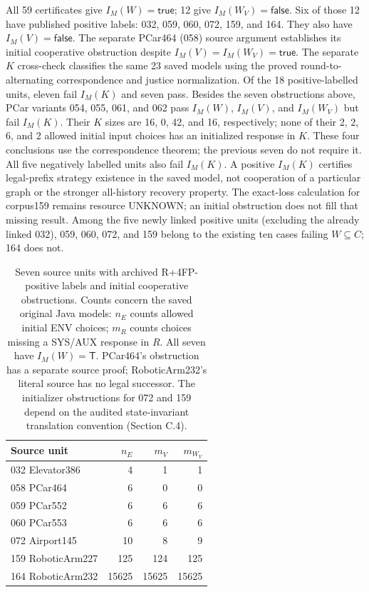\documentclass[11pt]{article}
\begin{document}
All 59 certificates give $I_M(W)=\mathsf{true}$; 12 give
$I_M(W_V)=\mathsf{false}$. Six of those 12 have published positive labels:
032, 059, 060, 072, 159, and 164. They also have $I_M(V)=\mathsf{false}$.
The separate PCar464 (058) source argument establishes its initial
cooperative obstruction despite $I_M(V)=I_M(W_V)=\mathsf{true}$.
The separate $K$ cross-check classifies the same 23 saved models using
the proved round-to-alternating correspondence and justice normalization.
Of the 18 positive-labelled units, eleven fail $I_M(K)$ and seven pass.
Besides the seven obstructions above, PCar variants 054, 055, 061, and 062
pass $I_M(W)$, $I_M(V)$, and $I_M(W_V)$ but fail $I_M(K)$.
Their $K$ sizes are 16, 0, 42, and 16, respectively; none of their
2, 2, 6, and 2 allowed initial input choices has an initialized response
in $K$. These four conclusions use the correspondence theorem; the
previous seven do not require it. All five negatively labelled units
also fail $I_M(K)$. A positive $I_M(K)$ certifies legal-prefix strategy
existence in the saved model, not cooperation of a particular graph
or the stronger all-history recovery property. The exact-loss calculation for corpus159 remains
resource UNKNOWN; an initial obstruction does not fill that missing result.
Among the five newly linked positive units (excluding the already linked 032),
059, 060, 072, and 159 belong to the existing ten cases failing
$W\subseteq C$; 164 does not.

\begin{table}[t]
\centering
\caption{Seven source units with archived R+4FP-positive labels and
initial cooperative obstructions. Counts concern the saved original Java models: $n_E$ counts allowed
initial ENV choices; $m_R$ counts choices missing a SYS/AUX response in $R$.
All seven have $I_M(W)=\mathsf{T}$. PCar464's obstruction has a separate
source proof; RoboticArm232's literal source has no legal successor.
The initializer obstructions for 072 and 159 depend on the audited
state-invariant translation convention (Section C.4).}
\label{tab:published-initial-obstructions}
\small
\setlength{\tabcolsep}{3pt}
\begin{tabular}{@{}lrrr@{}}
\toprule
Source unit & $n_E$ & $m_V$ & $m_{W_V}$\\
\midrule
032 Elevator386 & 4 & 1 & 1\\
058 PCar464 & 6 & 0 & 0\\
059 PCar552 & 6 & 6 & 6\\
060 PCar553 & 6 & 6 & 6\\
072 Airport145 & 10 & 8 & 9\\
159 RoboticArm227 & 125 & 124 & 125\\
164 RoboticArm232 & 15625 & 15625 & 15625\\
\bottomrule
\end{tabular}
\end{table}
\end{document}
